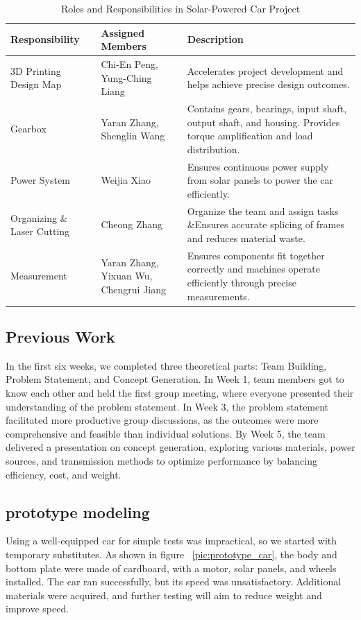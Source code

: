 \documentclass[12pt]{article}
\begin{document}
\begin{table}[h!]
    \centering
    \begin{tabular}{|>{\raggedright\arraybackslash}p{3cm}|>{\raggedright\arraybackslash}p{4.5cm}|>{\raggedright\arraybackslash}p{6cm}|}
        \hline
        \textbf{Responsibility} & \textbf{Assigned Members} & \textbf{Description} \\ 
        \hline
        3D Printing Design Map & Chi-En Peng, Yung-Ching Liang & 
        Accelerates project development and helps achieve precise design outcomes. \\ 
        \hline
        Gearbox & Yaran Zhang, Shenglin Wang & 
        Contains gears, bearings, input shaft, output shaft, and housing. Provides torque amplification and load distribution. \\ 
        \hline
        Power System & Weijia Xiao & 
        Ensures continuous power supply from solar panels to power the car efficiently. \\ 
        \hline
        Organizing  \& Laser Cutting  & Cheong Zhang & 
        Organize the team and assign tasks \&Ensures accurate splicing of frames and reduces material waste. \\ 
        \hline
        Measurement & Yaran Zhang, Yixuan Wu, Chengrui Jiang & 
        Ensures components fit together correctly and machines operate efficiently through precise measurements. \\ 
        \hline
    \end{tabular}
    \caption{Roles and Responsibilities in Solar-Powered Car Project}
\end{table}
\subsection{Previous Work}
In the first six weeks, we completed three theoretical parts: Team Building, Problem Statement, and Concept Generation. In Week 1, team members got to know each other and held the first group meeting, where everyone presented their understanding of the problem statement. In Week 3, the problem statement facilitated more productive group discussions, as the outcomes were more comprehensive and feasible than individual solutions. By Week 5, the team delivered a presentation on concept generation, exploring various materials, power sources, and transmission methods to optimize performance by balancing efficiency, cost, and weight.
\subsection{prototype modeling}
Using a well-equipped car for simple tests was impractical, so we started with temporary substitutes. 
As shown in figure  ~\ref{pic:prototype_car}, the body and bottom plate were made of cardboard, with a motor, solar panels, and wheels installed. 
The car ran successfully, but its speed was unsatisfactory. 
Additional materials were acquired, and further testing will aim to reduce weight and improve speed.
\end{document}
